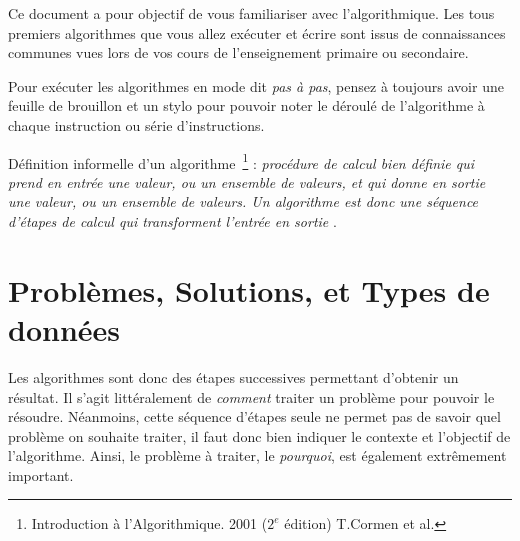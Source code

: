 \documentclass[11pt,a4paper]{article}
\begin{document}
\EncadreTitre

\bigskip


%
%

\bigskip


Ce document a pour objectif de vous familiariser avec l'algorithmique.
Les tous premiers algorithmes que vous allez exécuter et écrire sont issus de connaissances communes vues lors de vos cours de l'enseignement primaire ou secondaire.

Pour exécuter les algorithmes en mode dit \textit{pas à pas}, pensez à toujours avoir une feuille de brouillon et un stylo pour pouvoir noter le déroulé de l'algorithme à chaque instruction ou série d'instructions.

\bigskip

Définition informelle d'un algorithme~\footnote{Introduction à l'Algorithmique. 2001 ($2^{e}$ édition) T.Cormen et al.} : \og \textit{procédure de calcul bien définie qui prend en entrée une valeur, ou un ensemble de valeurs, et qui donne en sortie une valeur, ou un ensemble de valeurs. Un algorithme est donc une séquence d'étapes de calcul qui transforment l'entrée en sortie} \fg .

\medskip


\bigskip


\section{Problèmes, Solutions, et Types de données}

\bigskip

Les algorithmes sont donc des étapes successives permettant d'obtenir un résultat.
Il s'agit littéralement de \textit{comment} traiter un problème pour pouvoir le résoudre.
Néanmoins, cette séquence d'étapes seule ne permet pas de savoir quel problème on souhaite traiter, il faut donc bien indiquer le contexte et l'objectif de l'algorithme.
Ainsi, le problème à traiter, le \textit{pourquoi}, est également extrêmement important.
\end{document}
